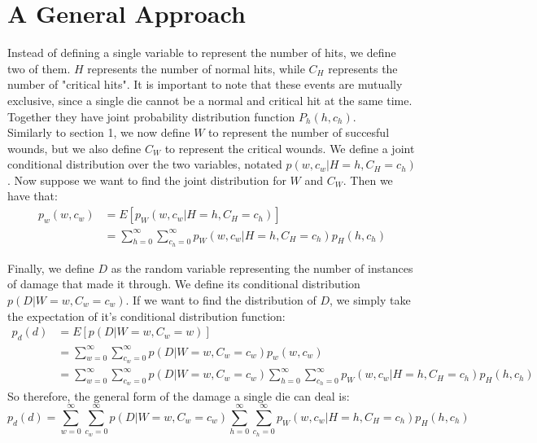 \documentclass{article}
\begin{document}
\section{A General Approach}
Instead of defining a single variable to represent the number of hits, we define two of them. $H$ represents the number of normal hits, while $C_H$ represents the number of "critical hits". It is important to note that these events are mutually exclusive, since a single die cannot be a normal and critical hit at the same time. Together they have joint probability distribution function $P_h(h,c_h)$.\\
Similarly to section 1, we now define $W$ to represent the number of succesful wounds, but we also define $C_W$ to represent the critical wounds. We define a joint conditional distribution over the two variables, notated $p(w,c_w | H=h, C_H = c_h)$. Now suppose we want to find the joint distribution for $W$ and $C_W$. Then we have that:
\begin{align*}
    p_w(w,c_w) &= E[p_W(w,c_w | H=h, C_H = c_h)] \\
    &= \sum_{h=0}^\infty \sum_{c_h=0}^\infty p_W(w,c_w | H=h, C_H = c_h) p_H(h,c_h)
\end{align*}

Finally, we define $D$ as the random variable representing the number of instances of damage that made it through. We define its conditional distribution $p(D | W = w, C_w = c_w)$. If we want to find the distribution of $D$, we simply take the expectation of it's conditional distribution function:
\begin{align*}
    p_d(d) &= E[p(D | W = w, C_w = w)]\\
    &= \sum_{w=0}^\infty \sum_{c_w = 0}^\infty p(D | W = w, C_w = c_w) p_w(w,c_w)\\
    &= \sum_{w=0}^\infty \sum_{c_w = 0}^\infty p(D | W = w, C_w = c_w) \sum_{h=0}^\infty \sum_{c_h=0}^\infty p_W(w,c_w | H=h, C_H = c_h) p_H(h,c_h)
\end{align*}
So therefore, the general form of the damage a single die can deal is:
\begin{equation}
    p_d(d) = \sum_{w=0}^\infty \sum_{c_w = 0}^\infty p(D | W = w, C_w = c_w) \sum_{h=0}^\infty \sum_{c_h=0}^\infty p_W(w,c_w | H=h, C_H = c_h) p_H(h,c_h)
\end{equation}
\end{document}

